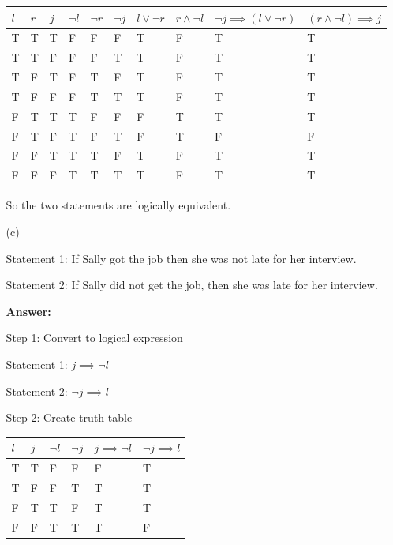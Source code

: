 \documentclass[12pt]{extreport}
\newcommand{\answer}[0]{\medskip \textbf{Answer:} \medskip}
\begin{document}
\begin{enumerate}
\begin{enumerate}
                \begin{tabular}{|l|l|l|l|l|l|l|l|l|l|}
                    \hline
                    \( l \) & \( r \) & \( j \) & \( \neg l \) & \( \neg r \) & \( \neg j \) & \( l \lor \neg r \) & \( r \land \neg l \) & \( \neg j \implies (l \lor \neg r) \) & \( (r \land \neg l) \implies j \) \\ \hline
                    T & T & T & F & F & F & T & F & T & T \\ \hline
                    T & T & F & F & F & T & T & F & T & T \\ \hline
                    T & F & T & F & T & F & T & F & T & T \\ \hline
                    T & F & F & F & T & T & T & F & T & T \\ \hline
                    F & T & T & T & F & F & F & T & T & T \\ \hline
                    F & T & F & T & F & T & F & T & F & F \\ \hline
                    F & F & T & T & T & F & T & F & T & T \\ \hline
                    F & F & F & T & T & T & T & F & T & T \\ \hline
                \end{tabular}

                So the two statements are logically equivalent.

            \item[(c)] 
            
            Statement 1: If Sally got the job then she was not late for her interview.

            Statement 2: If Sally did not get the job, then she was late for her interview.

                \answer

                Step 1: Convert to logical expression

                Statement 1: \( j \implies \neg l \)

                Statement 2: \( \neg j \implies l \)

                \medskip

                Step 2: Create truth table

                \begin{tabular}{|l|l|l|l|l|l|}
                    \hline
                    \( l \) & \( j \) & \( \neg l \) & \( \neg j \) & \( j \implies \neg l \) & \( \neg j \implies l \) \\ \hline
                    T & T & F & F & F & T \\ \hline
                    T & F & F & T & T & T \\ \hline
                    F & T & T & F & T & T \\ \hline
                    F & F & T & T & T & F \\ \hline
                \end{tabular}


\end{enumerate}
\end{enumerate}
\end{document}
